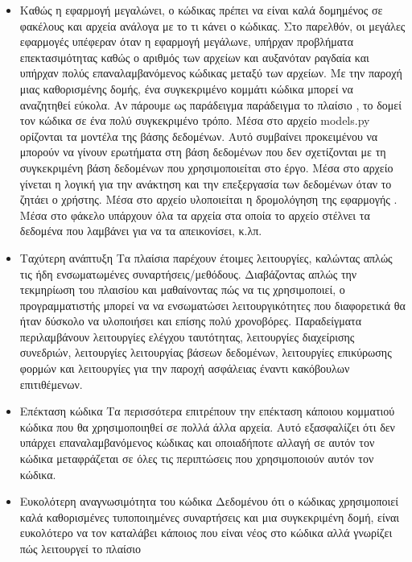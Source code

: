 \begin{itemize}
    \item  {}
    Καθώς η εφαρμογή μεγαλώνει, ο κώδικας πρέπει να είναι καλά δομημένος σε φακέλους
    και αρχεία ανάλογα με το τι κάνει ο κώδικας. Στο παρελθόν, οι μεγάλες εφαρμογές
    υπέφεραν όταν η εφαρμογή μεγάλωνε, υπήρχαν προβλήματα επεκτασιμότητας καθώς ο
    αριθμός των αρχείων  και  αυξανόταν ραγδαία και υπήρχαν
    πολύς επαναλαμβανόμενος κώδικας μεταξύ των αρχείων. Με την παροχή μιας καθορισμένης δομής,
    ένα συγκεκριμένο κομμάτι κώδικα μπορεί να αναζητηθεί εύκολα. Αν πάρουμε ως παράδειγμα
    παράδειγμα το πλαίσιο , το  δομεί τον κώδικα σε ένα
    πολύ συγκεκριμένο τρόπο. 
    Μέσα στο αρχείο models.py ορίζονται τα μοντέλα της βάσης δεδομένων. Αυτό συμβαίνει προκειμένου να μπορούν να γίνουν
    ερωτήματα στη βάση δεδομένων που δεν σχετίζονται με τη συγκεκριμένη βάση δεδομένων που χρησιμοποιείται στο
    έργο. Μέσα στο αρχείο  γίνεται η λογική για την ανάκτηση και την επεξεργασία των δεδομένων όταν
    το ζητάει ο χρήστης. Μέσα στο αρχείο  υλοποιείται η δρομολόγηση της
    εφαρμογής . Μέσα στο φάκελο  υπάρχουν όλα τα 
    αρχεία στα οποία το αρχείο  στέλνει τα δεδομένα που λαμβάνει για να τα απεικονίσει, κ.λπ.
    \item Ταχύτερη ανάπτυξη
    Τα πλαίσια παρέχουν έτοιμες λειτουργίες, καλώντας απλώς τις ήδη ενσωματωμένες συναρτήσεις/μεθόδους. Διαβάζοντας απλώς την τεκμηρίωση του πλαισίου και μαθαίνοντας πώς να τις χρησιμοποιεί, ο προγραμματιστής μπορεί να
    να ενσωματώσει λειτουργικότητες που διαφορετικά θα ήταν δύσκολο να υλοποιήσει
    και επίσης πολύ χρονοβόρες. Παραδείγματα περιλαμβάνουν λειτουργίες ελέγχου ταυτότητας, λειτουργίες διαχείρισης συνεδριών, λειτουργίες λειτουργίας βάσεων δεδομένων,
    λειτουργίες επικύρωσης φορμών και λειτουργίες για την παροχή ασφάλειας έναντι κακόβουλων επιτιθέμενων.
    \item Επέκταση κώδικα
    Τα περισσότερα  επιτρέπουν την επέκταση κάποιου κομματιού κώδικα που θα χρησιμοποιηθεί
    σε πολλά άλλα αρχεία. Αυτό εξασφαλίζει ότι δεν υπάρχει επαναλαμβανόμενος κώδικας και
    οποιαδήποτε αλλαγή σε αυτόν τον κώδικα μεταφράζεται σε όλες τις περιπτώσεις που χρησιμοποιούν αυτόν τον κώδικα.
    \item Ευκολότερη αναγνωσιμότητα του κώδικα
    Δεδομένου ότι ο κώδικας χρησιμοποιεί καλά καθορισμένες τυποποιημένες συναρτήσεις και μια συγκεκριμένη δομή, είναι ευκολότερο να τον καταλάβει κάποιος που είναι νέος στο
    κώδικα αλλά γνωρίζει πώς λειτουργεί το πλαίσιο
\end{itemize}

